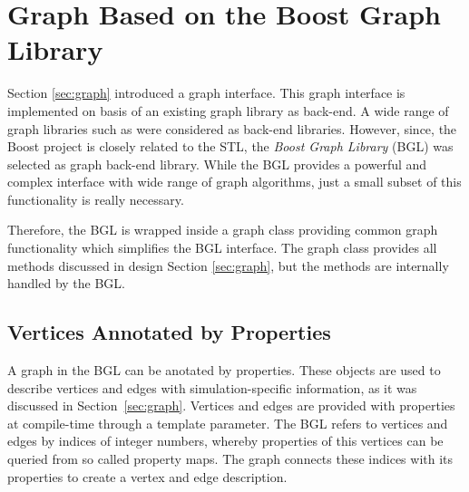 \section{Graph Based on the Boost Graph Library}
\label{sec:impl:graph}
Section \ref{sec:graph} introduced a graph interface.  This graph
interface is implemented on basis of an existing graph library as
back-end. A wide range of graph libraries such as \cite{ref:lemon,
  ref:boost_bgl, ref:igraph, ref:ogdf} were considered as back-end
libraries.  However, since, the Boost project is closely related to
the STL, the \emph{Boost Graph Library} \cite{ref:boost_bgl} (BGL) was
selected as graph back-end library.  While the BGL provides a powerful
and complex interface with wide range of graph algorithms, just a small subset of
this functionality is really necessary.

Therefore, the BGL is wrapped inside a graph class providing common
graph functionality which simplifies the BGL interface.  The graph
class provides all methods discussed in design Section
\ref{sec:graph}, but the methods are internally handled by the BGL.


\subsection{Vertices Annotated by Properties}

A graph in the BGL can be anotated by properties. These objects are
used to describe vertices and edges with simulation-specific
information, as it was discussed in Section~\ref{sec:graph}. Vertices
and edges are provided with properties at compile-time through a
template parameter.  The BGL refers to vertices and edges by indices
of integer numbers, whereby properties of this vertices can be queried
from so called property maps.  The graph connects these indices with
its properties to create a vertex and edge description.

